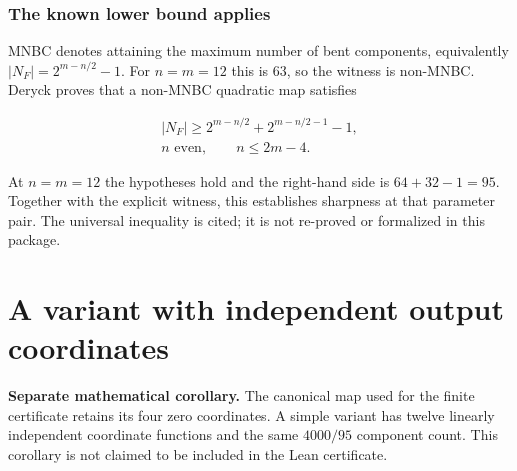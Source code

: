 \documentclass[11pt,a4paper]{article}
\theoremstyle{definition}
\begin{document}
\subsubsection*{The known lower bound applies}

MNBC denotes attaining the maximum number of bent components, equivalently $|N_{F}|=2^{m-n/2}-1$. For $n=m=12$ this is $63$, so the witness is non-MNBC. Deryck \cite[Theorem 5.4.15, printed p. 87]{ref1} proves that a non-MNBC quadratic map satisfies


\begin{equation}\label{eq:83}
\begin{gathered}|N_F|\ge2^{m-n/2}+2^{m-n/2-1}-1,\\n\text{ even},\qquad n\le2m-4.\end{gathered}
\end{equation}

At $n=m=12$ the hypotheses hold and the right-hand side is $64+32-1=95$. Together with the explicit witness, this establishes sharpness at that parameter pair. The universal inequality is cited; it is not re-proved or formalized in this package.


\section{A variant with independent output coordinates}\label{sec:variant}

\textbf{Separate mathematical corollary.} The canonical map used for the finite certificate retains its four zero coordinates. A simple variant has twelve linearly independent coordinate functions and the same $4000/95$ component count. This corollary is not claimed to be included in the Lean certificate.
\end{document}
